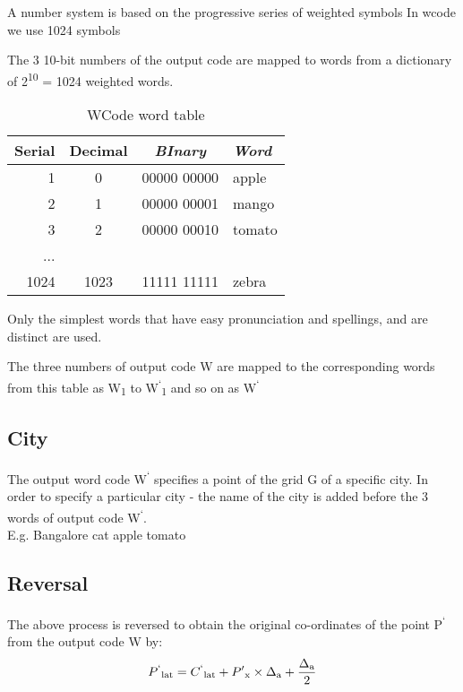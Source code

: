 \documentclass[conference]{IEEEtran}
\begin{document}
A number system is based on the progressive series of weighted symbols
In wcode we use 1024 symbols

The 3 10-bit numbers of the output code are mapped to words from a dictionary of 2\textsuperscript{10} = 1024 weighted words.
\begin{table}[h!]
\caption{WCode word table} \begin{center}
\begin{tabular}{r|c|c|l}
\textbf{Serial} & \textbf{Decimal} & \textbf{\textit{BInary}} & \textbf{\textit{Word}} \\
\hline
1 & 0 & 00000 00000 & apple\\
\hline
2 & 1 & 00000 00001 & mango \\
\hline
3 & 2 & 00000 00010 & tomato \\
... & & & \\
1024 & 1023 & 11111 11111 & zebra
\end{tabular}
\end{center} \end{table}

Only the simplest words that have easy pronunciation and spellings, and are distinct are used.

The three numbers of output code W are mapped to the corresponding words from this table as W\textsubscript{1} to W\textsuperscript{`}\textsubscript{1} and so on as W\textsuperscript{`}
\subsection{City}
The output word code W\textsuperscript{`} specifies a point of the grid G of a specific city. In order to specify a particular city - the name of the city is added before the 3 words of output code W\textsuperscript{`}.\\

E.g. Bangalore cat apple tomato

\subsection{Reversal}\label{AA}
The above process is reversed to obtain the original co-ordinates of the point P\textsuperscript{`} from the output code W by:
\begin{equation}P\textsuperscript{`}\textsubscript{lat} = C\textsuperscript{`}\textsubscript{lat} +  P'\textsubscript{x} \times \Delta\textsubscript{a} + \frac{\Delta\textsubscript{a}}{2}\end{equation}
\end{document}
